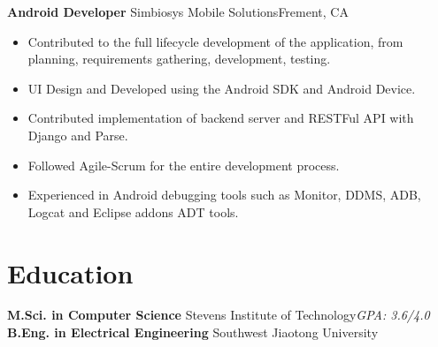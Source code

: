\documentclass[10pt,letterpaper,sans]{moderncv}        %
\begin{document}
\newpage

\vspace*{0.5cm}
{\textbf{Android Developer}}
{Simbiosys Mobile Solutions}{Frement, CA}{}{
\begin{itemize}
\item Contributed to the full lifecycle development of the application, from planning, requirements gathering, development, testing.
\item UI Design and Developed using the Android SDK and Android Device.
\item Contributed implementation of backend server and  RESTFul API  with Django and Parse.
\item Followed Agile-Scrum for the entire development process.
\item Experienced in Android debugging tools such as Monitor, DDMS, ADB, Logcat and Eclipse addons ADT tools.
\end{itemize}} 


\section{Education}
{\textbf{M.Sci. in Computer Science}}
{Stevens Institute of Technology}{}{\textit{GPA: 3.6/4.0}}{}  %
{\textbf{B.Eng. in Electrical Engineering}}
{Southwest Jiaotong University}{}{}{}
\end{document}
